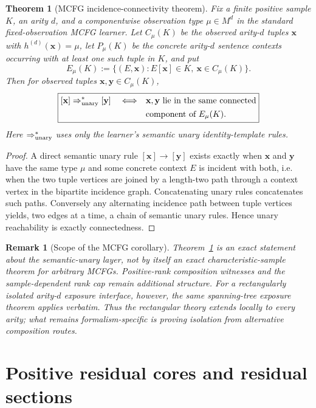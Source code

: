 \documentclass[11pt]{article}
\newtheorem{theorem}[definition]{Theorem}
\newtheorem{remark}[definition]{Remark}
\begin{document}
\begin{theorem}[MCFG incidence-connectivity theorem]
\label{thm:mcfg-incidence}
Fix a finite positive sample $K$, an arity $d$, and a componentwise observation
type $\mu\in M^d$ in the standard fixed-observation MCFG learner.  Let
$C_\mu(K)$ be the observed arity-$d$ tuples $\mathbf x$ with
$h^{(d)}(\mathbf x)=\mu$, let $P_\mu(K)$ be the concrete arity-$d$ sentence
contexts occurring with at least one such tuple in $K$, and put
\[
 E_\mu(K)
 :=
 \{(E,\mathbf x):E[\mathbf x]\in K,\ \mathbf x\in C_\mu(K)\}.
\]
Then for observed tuples $\mathbf x,\mathbf y\in C_\mu(K)$,
\[
 \boxed{
 \begin{aligned}
 [\mathbf x]\Rightarrow_{\rm unary}^*[\mathbf y]
 \quad\Longleftrightarrow\quad
 &\mathbf x,\mathbf y\text{ lie in the same connected}\\
 &\text{component of }E_\mu(K).
 \end{aligned}
 }
\]
Here $\Rightarrow_{\rm unary}^*$ uses only the learner's semantic unary
identity-template rules.
\end{theorem}

\begin{proof}
A direct semantic unary rule $[\mathbf x]\to[\mathbf y]$ exists exactly when
$\mathbf x$ and $\mathbf y$ have the same type $\mu$ and some concrete context
$E$ is incident with both, i.e. when the two tuple vertices are joined by a
length-two path through a context vertex in the bipartite incidence graph.
Concatenating unary rules concatenates such paths.  Conversely any alternating
incidence path between tuple vertices yields, two edges at a time, a chain of
semantic unary rules.  Hence unary reachability is exactly connectedness.
\end{proof}

\begin{remark}[Scope of the MCFG corollary]
Theorem~\ref{thm:mcfg-incidence} is an exact statement about the semantic-unary
layer, not by itself an exact characteristic-sample theorem for arbitrary
MCFGs.  Positive-rank composition witnesses and the sample-dependent rank cap remain
additional structure.
For a rectangularly isolated arity-$d$ exposure interface, however, the same
spanning-tree exposure theorem applies verbatim.  Thus the rectangular theory
extends locally to every arity; what remains formalism-specific is proving
isolation from alternative composition routes.
\end{remark}

\section{Positive residual cores and residual sections}
\end{document}

